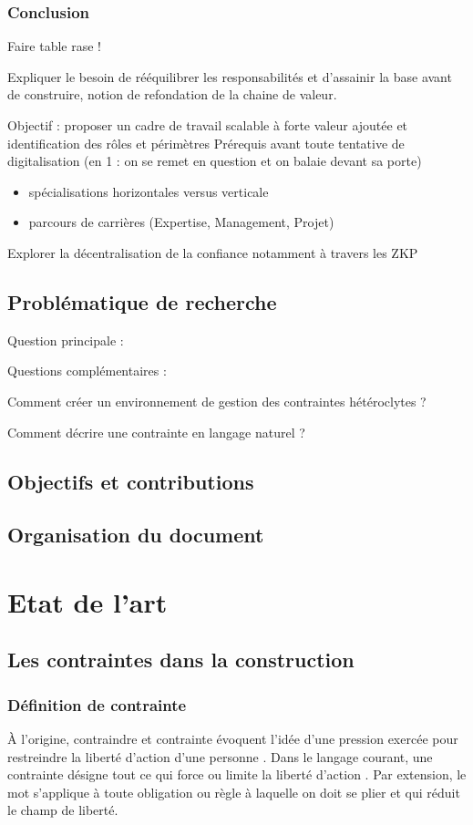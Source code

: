 \documentclass[a4paper,12pt]{article}
\begin{document}
\subsubsection{Conclusion}
\label{sec:org3cc2b14}
Faire table rase !


Expliquer le besoin de rééquilibrer les responsabilités et d'assainir la base avant de construire, notion de refondation de la chaine de valeur.

Objectif : proposer un cadre de travail scalable à forte valeur ajoutée et identification des rôles et périmètres 
Prérequis avant toute tentative de digitalisation (en 1 : on se remet en question et on balaie devant sa porte)
\begin{itemize}
\item spécialisations horizontales versus verticale
\item parcours de carrières (Expertise, Management, Projet)
\end{itemize}

Explorer la décentralisation de la confiance notamment à travers les ZKP
\subsection{Problématique de recherche}
\label{sec:orga0095f8}
Question principale :

Questions complémentaires :

Comment créer un environnement de gestion des contraintes hétéroclytes ?

Comment décrire une contrainte en langage naturel ?
\subsection{Objectifs et contributions}
\label{sec:org31e7d23}

\subsection{Organisation du document}
\label{sec:org896a24a}
\clearpage
\section{Etat de l'art}
\label{sec:org0eb1b1a}
\subsection{Les contraintes dans la construction}
\label{sec:orgd5016f2}
\subsubsection{Définition de contrainte}
\label{sec:org82d926a}
À l’origine, contraindre et contrainte évoquent l’idée d’une pression exercée pour restreindre la liberté d’action d’une personne \autocite{CONTRAINTEEtymologieCONTRAINTE}. Dans le langage courant, une contrainte désigne tout ce qui force ou limite la liberté d’action \autocite{DefinitionContrainte}. Par extension, le mot s’applique à toute obligation ou règle à laquelle on doit se plier et qui réduit le champ de liberté.
\end{document}
